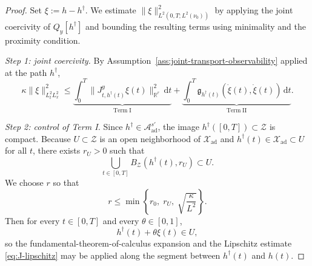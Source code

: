 \documentclass[10pt,a4paper]{amsart}
\renewcommand{\d}{\mathrm{d}}
\begin{document}
\begin{proof}
    Set \(\xi:=h-h^\dagger\). We estimate \(\|\xi\|_{L^2(0,T;L^2(\nu_0))}^2\) by applying the joint
    coercivity of \(Q_y[h^\dagger]\) and bounding the resulting terms using minimality and the
    proximity condition.

    \medskip
    \noindent
    \emph{Step 1: joint coercivity.}
    By Assumption~\ref{ass:joint-transport-observability} applied at the path \(h^\dagger\),
    \begin{equation}
        \label{eq:stab-joint-coercivity}
        \kappa\|\xi\|_{L^2_tL^2_x}^2
        \le
        \underbrace{
        \int_0^T \|J_{t,h^\dagger(t)}^{y}\xi(t)\|_{\mathbb R^r}^2\,\d t
        }_{\mathrm{Term\;I}}
        +
        \underbrace{
            \int_0^T \mathfrak g_{h^\dagger(t)}(\dot\xi(t),\dot\xi(t))\,\d t
        }_{\mathrm{Term\;II}}.
    \end{equation}

    \medskip
    \noindent
    \emph{Step 2: control of Term I.}
    Since \(h^\dagger\in \mathcal A_{\mathrm{ad}}^{s'}\), the image
    \(h^\dagger([0,T])\subset \mathcal Z\) is compact. Because \(U\subset\mathcal Z\) is an open
    neighborhood of \(\mathcal X_{\mathrm{ad}}\) and \(h^\dagger(t)\in\mathcal X_{\mathrm{ad}}\subset U\)
    for all \(t\), there exists \(r_U>0\) such that
    \[
        \bigcup_{t\in[0,T]} B_{\mathcal Z}(h^\dagger(t),r_U)\subset U.
    \]
    We choose \(r\) so that
    \[
        r\le \min\left\{r_0,\;r_U,\;\sqrt{\frac{\kappa}{L^2}}\right\}.
    \]
    Then for every \(t\in[0,T]\) and every \(\theta\in[0,1]\),
    \[
        h^\dagger(t)+\theta\xi(t)\in U,
    \]
    so the fundamental-theorem-of-calculus expansion and the Lipschitz estimate
    \eqref{eq:J-lipschitz} may be applied along the segment between
    \(h^\dagger(t)\) and \(h(t)\).


\end{proof}
\end{document}
